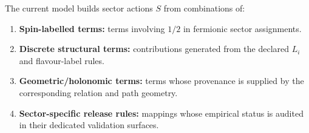The current model builds sector actions $S$ from combinations of:
\begin{enumerate}
\item \textbf{Spin-labelled terms:} terms involving $1/2$ in fermionic sector assignments.
\item \textbf{Discrete structural terms:} contributions generated from the declared $L_i$ and flavour-label rules.
\item \textbf{Geometric/holonomic terms:} terms whose provenance is supplied by the corresponding relation and path geometry.
\item \textbf{Sector-specific release rules:} mappings whose empirical status is audited in their dedicated validation surfaces.
\end{enumerate}
